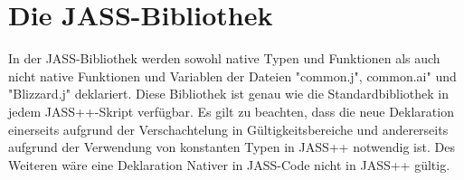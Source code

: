 \chapter{Die JASS-Bibliothek}
In der JASS-Bibliothek werden sowohl native Typen und Funktionen als auch nicht native Funktionen und Variablen der Dateien
"common.j", common.ai" und "Blizzard.j" deklariert.
Diese Bibliothek ist genau wie die Standardbibliothek in jedem JASS++-Skript verfügbar.
Es gilt zu beachten, dass die neue Deklaration einerseits aufgrund der Verschachtelung in Gültigkeitsbereiche und andererseits
aufgrund der Verwendung von konstanten Typen in JASS++ notwendig ist.
Des Weiteren wäre eine Deklaration Nativer in JASS-Code nicht in JASS++ gültig.

